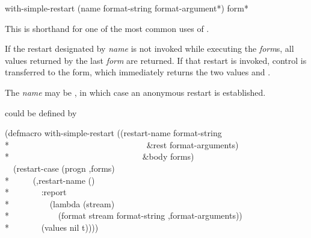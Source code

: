 \begin{defmac}
with-simple-restart (name format-string {format-argument}*)
                    {form}*

This is shorthand for one of the most common uses of .

If the restart designated by \emph{name} is not invoked while executing the
\emph{form\/}s, all values returned by the last \emph{form} are returned. If
that restart is invoked, control is transferred to the 
form, which immediately returns the two values  and .

The \emph{name} may be , in which case an anonymous restart is
established.

 could be defined by
\begin{lisp}
(defmacro with-simple-restart ((restart-name format-string \\*
~~~~~~~~~~~~~~~~~~~~~~~~~~~~~~~~\&rest format-arguments) \\*
~~~~~~~~~~~~~~~~~~~~~~~~~~~~~~~\&body forms) \\
~~{\Xbq}(restart-case (progn ,{\Xatsign}forms) \\*
~~~~~(,restart-name () \\*
~~~~~~~:report \\*
~~~~~~~~~(lambda (stream) \\*
~~~~~~~~~~~(format stream format-string ,{\Xatsign}format-arguments)) \\*
~~~~~~~(values nil t))))
\end{lisp}


\end{defmac}
